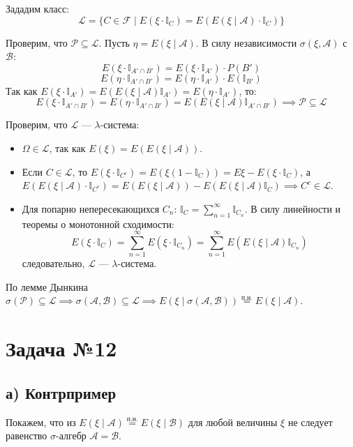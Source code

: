 \documentclass[12pt]{article}
\begin{document}
Зададим класс:
\[
\mathcal{L} = \{ C \in \mathcal{F} \mid E(\xi \cdot \mathbb{I}_C) = E(E(\xi \mid \mathcal{A}) \cdot \mathbb{I}_C) \}
\]

Проверим, что $\mathcal{P} \subseteq \mathcal{L}$. Пусть $\eta = E(\xi \mid \mathcal{A})$. В силу независимости $\sigma(\xi, \mathcal{A})$ с $\mathcal{B}$:
\[
E(\xi \cdot \mathbb{I}_{A' \cap B'}) = E(\xi \cdot \mathbb{I}_{A'}) \cdot P(B')
\]
\[
E(\eta \cdot \mathbb{I}_{A' \cap B'}) = E(\eta \cdot \mathbb{I}_{A'}) \cdot E(\mathbb{I}_{B'})
\]
Так как $E(\xi \cdot \mathbb{I}_{A'}) = E(E(\xi \mid \mathcal{A}) \mathbb{I}_{A'}) = E(\eta \cdot \mathbb{I}_{A'})$, то:
\[
E(\xi \cdot \mathbb{I}_{A' \cap B'}) = E(\eta \cdot \mathbb{I}_{A' \cap B'}) = E(E(\xi \mid \mathcal{A}) \mathbb{I}_{A' \cap B'}) \implies \mathcal{P} \subseteq \mathcal{L}
\]

Проверим, что $\mathcal{L}$ — $\lambda$-система:
\begin{itemize}
    \item[а)] $\Omega \in \mathcal{L}$, так как $E(\xi) = E(E(\xi \mid \mathcal{A}))$.
    \item[б)] Если $C \in \mathcal{L}$, то $E(\xi \cdot \mathbb{I}_{C^c}) = E(\xi (1 - \mathbb{I}_C)) = E\xi - E(\xi \cdot \mathbb{I}_C)$, а $E(E(\xi \mid \mathcal{A}) \cdot \mathbb{I}_{C^c}) = E(E(\xi \mid \mathcal{A})) - E(E(\xi \mid \mathcal{A}) \mathbb{I}_C) \implies C^c \in \mathcal{L}$.
    \item[в)] Для попарно непересекающихся $C_n$: $\mathbb{I}_C = \sum_{n=1}^\infty \mathbb{I}_{C_n}$. В силу линейности и теоремы о монотонной сходимости:
    \[
    E(\xi \cdot \mathbb{I}_C) = \sum_{n=1}^\infty E(\xi \cdot \mathbb{I}_{C_n}) = \sum_{n=1}^\infty E(E(\xi \mid \mathcal{A}) \mathbb{I}_{C_n})
    \]
    следовательно, $\mathcal{L}$ — $\lambda$-система.
\end{itemize}

По лемме Дынкина $\sigma(\mathcal{P}) \subseteq \mathcal{L} \implies \sigma(\mathcal{A}, \mathcal{B}) \subseteq \mathcal{L} \implies E(\xi \mid \sigma(\mathcal{A}, \mathcal{B})) \stackrel{\text{п.н.}}{=} E(\xi \mid \mathcal{A})$.

\bigskip
\section*{Задача №12}

\subsection*{а) Контрпример}
Покажем, что из $E(\xi \mid \mathcal{A}) \stackrel{\text{п.н.}}{=} E(\xi \mid \mathcal{B})$ для любой величины $\xi$ не следует равенство $\sigma$-алгебр $\mathcal{A} = \mathcal{B}$.
\end{document}

